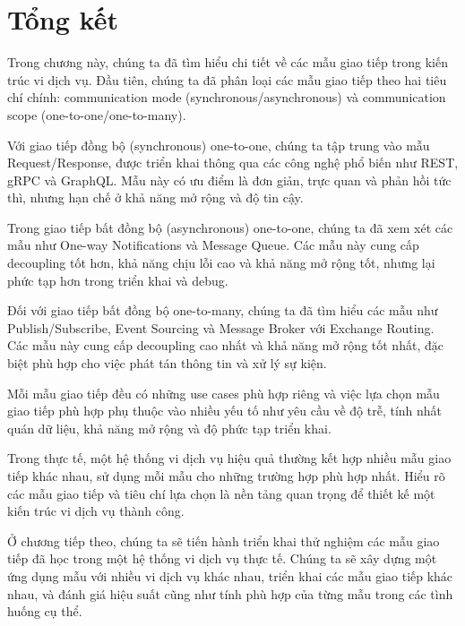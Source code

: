 \section{Tổng kết}
Trong chương này, chúng ta đã tìm hiểu chi tiết về các mẫu giao tiếp trong kiến trúc vi dịch vụ. Đầu tiên, chúng ta đã phân loại các mẫu giao tiếp theo hai tiêu chí chính: communication mode (synchronous/asynchronous) và communication scope (one-to-one/one-to-many).

Với giao tiếp đồng bộ (synchronous) one-to-one, chúng ta tập trung vào mẫu Request/Response, được triển khai thông qua các công nghệ phổ biến như REST, gRPC và GraphQL. Mẫu này có ưu điểm là đơn giản, trực quan và phản hồi tức thì, nhưng hạn chế ở khả năng mở rộng và độ tin cậy.

Trong giao tiếp bất đồng bộ (asynchronous) one-to-one, chúng ta đã xem xét các mẫu như One-way Notifications và Message Queue. Các mẫu này cung cấp decoupling tốt hơn, khả năng chịu lỗi cao và khả năng mở rộng tốt, nhưng lại phức tạp hơn trong triển khai và debug.

Đối với giao tiếp bất đồng bộ one-to-many, chúng ta đã tìm hiểu các mẫu như Publish/Subscribe, Event Sourcing và Message Broker với Exchange Routing. Các mẫu này cung cấp decoupling cao nhất và khả năng mở rộng tốt nhất, đặc biệt phù hợp cho việc phát tán thông tin và xử lý sự kiện.

Mỗi mẫu giao tiếp đều có những use cases phù hợp riêng và việc lựa chọn mẫu giao tiếp phù hợp phụ thuộc vào nhiều yếu tố như yêu cầu về độ trễ, tính nhất quán dữ liệu, khả năng mở rộng và độ phức tạp triển khai.

Trong thực tế, một hệ thống vi dịch vụ hiệu quả thường kết hợp nhiều mẫu giao tiếp khác nhau, sử dụng mỗi mẫu cho những trường hợp phù hợp nhất. Hiểu rõ các mẫu giao tiếp và tiêu chí lựa chọn là nền tảng quan trọng để thiết kế một kiến trúc vi dịch vụ thành công.

Ở chương tiếp theo, chúng ta sẽ tiến hành triển khai thử nghiệm các mẫu giao tiếp đã học trong một hệ thống vi dịch vụ thực tế. Chúng ta sẽ xây dựng một ứng dụng mẫu với nhiều vi dịch vụ khác nhau, triển khai các mẫu giao tiếp khác nhau, và đánh giá hiệu suất cũng như tính phù hợp của từng mẫu trong các tình huống cụ thể.